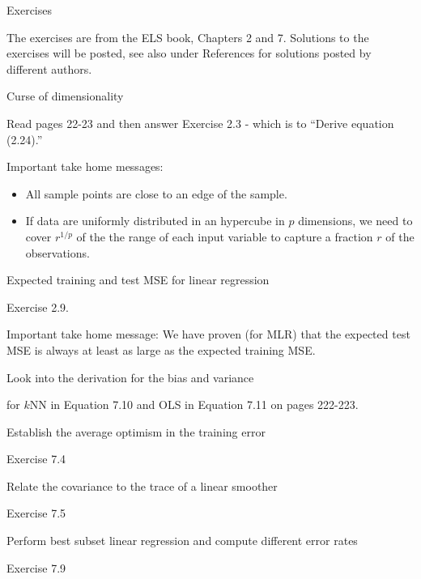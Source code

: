 \documentclass[
  ignorenonframetext,
]{beamer}
\providecommand{\tightlist}{%
  \setlength{\itemsep}{0pt}\setlength{\parskip}{0pt}}
\begin{document}
\begin{frame}{Exercises}
\protect\hypertarget{exercises}{}

The exercises are from the ELS book, Chapters 2 and 7. Solutions to the
exercises will be posted, see also under References for solutions posted
by different authors.

\begin{block}{Curse of dimensionality}

Read pages 22-23 and then answer Exercise 2.3 - which is to ``Derive
equation (2.24).''

Important take home messages:

\begin{itemize}
\tightlist
\item
  All sample points are close to an edge of the sample.
\item
  If data are uniformly distributed in an hypercube in \(p\) dimensions,
  we need to cover \(r^{1/p}\) of the the range of each input variable
  to capture a fraction \(r\) of the observations.
\end{itemize}

\end{block}

\begin{block}{Expected training and test MSE for linear regression}

Exercise 2.9.

Important take home message: We have proven (for MLR) that the expected
test MSE is always at least as large as the expected training MSE.

\end{block}

\end{frame}

\begin{frame}

\begin{block}{Look into the derivation for the bias and variance}

for \(k\)NN in Equation 7.10 and OLS in Equation 7.11 on pages 222-223.

\end{block}

\begin{block}{Establish the average optimism in the training error}

Exercise 7.4

\end{block}

\begin{block}{Relate the covariance to the trace of a linear smoother}

Exercise 7.5

\end{block}

\begin{block}{Perform best subset linear regression and compute
different error rates}

Exercise 7.9

\end{block}

\end{frame}
\end{document}
